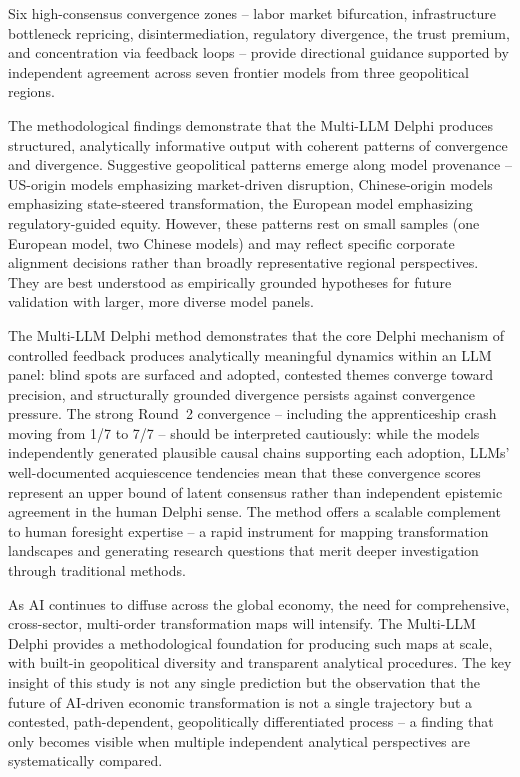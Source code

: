 \documentclass[preprint,review,12pt]{elsarticle}
\begin{document}
Six high-consensus convergence zones -- labor market bifurcation, infrastructure bottleneck repricing, disintermediation, regulatory divergence, the trust premium, and concentration via feedback loops -- provide directional guidance supported by independent agreement across seven frontier models from three geopolitical regions.

The methodological findings demonstrate that the Multi-LLM Delphi produces structured, analytically informative output with coherent patterns of convergence and divergence. Suggestive geopolitical patterns emerge along model provenance -- US-origin models emphasizing market-driven disruption, Chinese-origin models emphasizing state-steered transformation, the European model emphasizing regulatory-guided equity. However, these patterns rest on small samples (one European model, two Chinese models) and may reflect specific corporate alignment decisions rather than broadly representative regional perspectives. They are best understood as empirically grounded hypotheses for future validation with larger, more diverse model panels.

The Multi-LLM Delphi method demonstrates that the core Delphi mechanism of controlled feedback produces analytically meaningful dynamics within an LLM panel: blind spots are surfaced and adopted, contested themes converge toward precision, and structurally grounded divergence persists against convergence pressure. The strong Round~2 convergence -- including the apprenticeship crash moving from 1/7 to 7/7 -- should be interpreted cautiously: while the models independently generated plausible causal chains supporting each adoption, LLMs' well-documented acquiescence tendencies mean that these convergence scores represent an upper bound of latent consensus rather than independent epistemic agreement in the human Delphi sense. The method offers a scalable complement to human foresight expertise -- a rapid instrument for mapping transformation landscapes and generating research questions that merit deeper investigation through traditional methods.

As AI continues to diffuse across the global economy, the need for comprehensive, cross-sector, multi-order transformation maps will intensify. The Multi-LLM Delphi provides a methodological foundation for producing such maps at scale, with built-in geopolitical diversity and transparent analytical procedures. The key insight of this study is not any single prediction but the observation that the future of AI-driven economic transformation is not a single trajectory but a contested, path-dependent, geopolitically differentiated process -- a finding that only becomes visible when multiple independent analytical perspectives are systematically compared.
\end{document}
